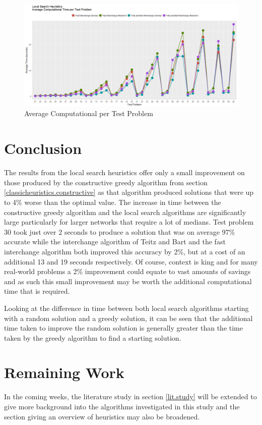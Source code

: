 \documentclass[11pt]{article}
\begin{document}
	\begin{figure}[H]
		\begin{center}
			\includegraphics[width=14cm]{LSavtime.png}
			\caption{Average Computational per Test Problem}
			\label{LS.av.time}
		\end{center}
	\end{figure}

		
	\section{Conclusion} \label{conclusion}
	The results from the local search heuristics offer only a small improvement on those produced by the constructive greedy algorithm from section \ref{classicheuristics.constructive} as that algorithm produced solutions that were up to 4\% worse than the optimal value.  The increase in time between the constructive greedy algorithm and the local search algorithms are significantly large particularly for larger networks that require a lot of medians.  Test problem 30 took just over 2 seconds to produce a solution that was on average 97\% accurate while the interchange algorithm of Teitz and Bart and the fast interchange algorithm both improved this accuracy by 2\%, but at a cost of an additional 13 and 19 seconds respectively.  Of course, context is king and for many real-world problems a 2\% improvement could equate to vast amounts of savings and as such this small improvement may be worth the additional computational time that is required.
	
	Looking at the difference in time between both local search algorithms starting with a random solution and a greedy solution, it can be seen that the additional time taken to improve the random solution is generally greater than the time taken by the greedy algorithm to find a starting solution.
	
	
	\section{Remaining Work}
	In the coming weeks, the literature study in section \ref{lit.study} will be extended to give more background into the algorithms investigated in this study and the section giving an overview of heuristics may also be broadened.
	
\end{document}

